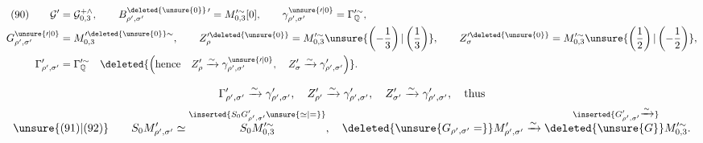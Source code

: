 \[
\begin{aligned}
 (90)\qquad
 \mathcal G'&=\mathcal G_{0,3}^{+\wedge},\qquad
 B_{\rho',\sigma'}^{\deleted{\unsure{0}}\,\prime}
 =M_{0,3}^{\prime\sim}[0],\qquad
 \gamma_{\rho',\sigma'}^{\unsure{\prime|0}}
 =\Gamma_{\mathbb Q}^{\prime\sim},\\
 G_{\rho',\sigma'}^{\unsure{\prime|0}}
 &=M_{0,3}^{\prime\deleted{\unsure{0}}\sim},\qquad
 Z_{\rho}^{\prime\deleted{\unsure{0}}}
 =M_{0,3}^{\prime\sim}\unsure{\left(-\frac13\right)|\left(\frac13\right)},\qquad
 Z_{\sigma}^{\prime\deleted{\unsure{0}}}
 =M_{0,3}^{\prime\sim}\unsure{\left(\frac12\right)|\left(-\frac12\right)},\\
 \Gamma_{\rho',\sigma'}^{\prime}&=\Gamma_{\mathbb Q}^{\prime\sim}
 \quad\deleted{\left(\text{hence}\quad
 Z_{\rho}^{\prime}\xrightarrow{\sim}\gamma_{\rho',\sigma'}^{\unsure{\prime|0}},\quad
 Z_{\sigma}^{\prime}\xrightarrow{\sim}\gamma_{\rho',\sigma'}^{\prime}\right)}.
\end{aligned}
\]


\[
\begin{gathered}
\Gamma_{\rho',\sigma'}^{\prime}\xrightarrow{\sim}\gamma_{\rho',\sigma'}^{\prime},\quad
Z_{\rho'}^{\prime}\xrightarrow{\sim}\gamma_{\rho',\sigma'}^{\prime},\quad
Z_{\sigma'}^{\prime}\xrightarrow{\sim}\gamma_{\rho',\sigma'}^{\prime},\quad\text{thus}\\
\unsure{(91)|(92)}\qquad
S_0M_{\rho',\sigma'}^{\prime}\simeq
\overset{\inserted{S_0G_{\rho',\sigma'}^{\prime}\unsure{\simeq|=}}}{S_0M_{0,3}^{\prime\sim}},\quad
\deleted{\unsure{G_{\rho',\sigma'}=}}M_{\rho',\sigma'}^{\prime}\xrightarrow{\sim}
\overset{\inserted{G_{\rho',\sigma'}^{\prime}\xrightarrow{\sim}}}{\deleted{\unsure{G}}M_{0,3}^{\prime\sim}}.
\end{gathered}
\]

